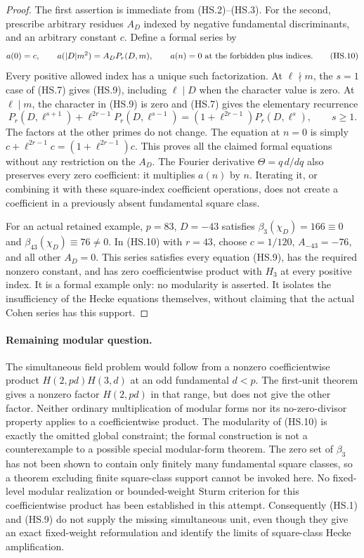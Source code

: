 \begin{proof}
The first assertion is immediate from (HS.2)--(HS.3).
For the second, prescribe arbitrary residues $A_D$ indexed by
negative fundamental discriminants, and an arbitrary constant $c$.
Define a formal series by
\[
 a(0)=c,\qquad
 a(|D|m^2)=A_D P_r(D,m),
 \qquad a(n)=0\ \hbox{at the forbidden plus indices}.   \tag{HS.10}
\]
Every positive allowed index has a unique such factorization.
At $\ell\nmid m$, the $s=1$ case of (HS.7) gives (HS.9),
including $\ell\mid D$ when the character value is zero.
At $\ell\mid m$, the character in (HS.9) is zero and
(HS.7) gives the elementary recurrence
\[
 P_r(D,\ell^{s+1})+\ell^{2r-1}P_r(D,\ell^{s-1})
       =(1+\ell^{2r-1})P_r(D,\ell^s),\qquad s\geq1.
                                                               \tag{HS.11}
\]
The factors at the other primes do not change.
The equation at $n=0$ is simply
$c+\ell^{2r-1}c=(1+\ell^{2r-1})c$.
This proves all the claimed formal equations without any
restriction on the $A_D$.
The Fourier derivative $\Theta=q\,d/dq$ also preserves every
zero coefficient: it multiplies $a(n)$ by $n$.
Iterating it, or combining it with these square-index
coefficient operations, does not create a coefficient in a
previously absent fundamental square class.

For an actual retained example, $p=83$, $D=-43$ satisfies
$\beta_3(\chi_D)=166\equiv0$ and
$\beta_{43}(\chi_D)\equiv76\ne0$.
In (HS.10) with $r=43$, choose $c=1/120$,
$A_{-43}=-76$, and all other $A_D=0$.
This series satisfies every equation (HS.9), has the required
nonzero constant, and has zero coefficientwise product with
$H_3$ at every positive index.  It is a formal example only:
no modularity is asserted.  It isolates the insufficiency of
the Hecke equations themselves, without claiming that the
actual Cohen series has this support.
\end{proof}

\paragraph{Remaining modular question.}
The simultaneous field problem would follow from a nonzero
coefficientwise product
$H(2,pd)H(3,d)$ at an odd fundamental $d<p$.
The first-unit theorem gives a nonzero factor $H(2,pd)$ in that
range, but does not give the other factor.
Neither ordinary multiplication of modular forms nor its
no-zero-divisor property applies to a coefficientwise product.
The modularity of (HS.10) is exactly the omitted global constraint;
the formal construction is not a counterexample to a possible
special modular-form theorem.
The zero set of $\beta_3$ has not been shown to contain only
finitely many fundamental square classes, so a theorem excluding
finite square-class support cannot be invoked here.
No fixed-level modular realization or bounded-weight Sturm
criterion for this coefficientwise product has been established
in this attempt.  Consequently (HS.1) and (HS.9) do not supply
the missing simultaneous unit, even though they give an exact
fixed-weight reformulation and identify the limits of
square-class Hecke amplification.

